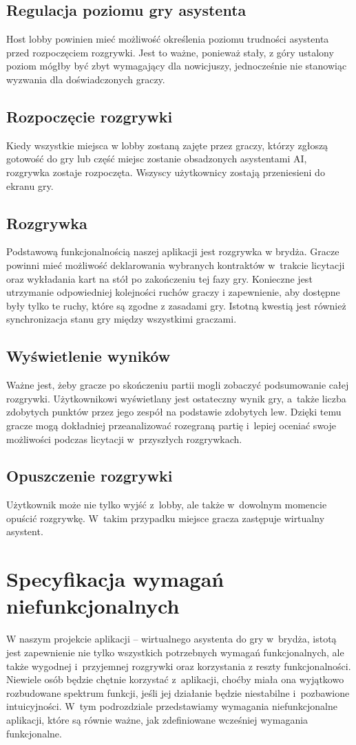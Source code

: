 \subsection{Regulacja poziomu gry asystenta}
Host lobby powinien mieć możliwość określenia poziomu trudności asystenta przed rozpoczęciem
rozgrywki. Jest to ważne, ponieważ stały, z góry ustalony poziom mógłby być zbyt wymagający
dla nowicjuszy, jednocześnie nie stanowiąc wyzwania dla doświadczonych graczy.

\subsection{Rozpoczęcie rozgrywki}
Kiedy wszystkie miejsca w lobby zostaną zajęte przez graczy, którzy zgłoszą gotowość do gry
lub część miejsc zostanie obsadzonych asystentami AI, rozgrywka zostaje rozpoczęta.
Wszyscy użytkownicy zostają przeniesieni do ekranu gry.
\subsection{Rozgrywka}
Podstawową funkcjonalnością naszej aplikacji jest rozgrywka w brydża.
Gracze powinni mieć możliwość deklarowania wybranych kontraktów
w~trakcie licytacji oraz wykładania kart na stół po zakończeniu tej fazy gry.
Konieczne jest utrzymanie odpowiedniej kolejności ruchów graczy i zapewnienie, aby
dostępne były tylko te ruchy, które są zgodne z zasadami gry. Istotną kwestią jest
również synchronizacja stanu gry między wszystkimi graczami.
\subsection{Wyświetlenie wyników}
Ważne jest, żeby gracze po skończeniu partii mogli zobaczyć
podsumowanie całej rozgrywki. Użytkownikowi wyświetlany jest ostateczny
wynik gry, a~także liczba zdobytych punktów przez jego zespół na
podstawie zdobytych lew. Dzięki temu gracze mogą dokładniej
przeanalizować rozegraną partię i~lepiej oceniać swoje możliwości
podczas licytacji w~przyszłych rozgrywkach.
\subsection{Opuszczenie rozgrywki}
Użytkownik może nie tylko wyjść z~lobby, ale także w~dowolnym momencie
opuścić rozgrywkę. W~takim przypadku miejsce gracza zastępuje
wirtualny asystent.




\section{Specyfikacja wymagań niefunkcjonalnych}
W naszym projekcie aplikacji -- wirtualnego asystenta do gry w~brydża,
istotą jest zapewnienie nie tylko wszystkich potrzebnych wymagań
funkcjonalnych, ale także wygodnej i~przyjemnej rozgrywki oraz
korzystania z reszty funkcjonalności. Niewiele osób będzie chętnie
korzystać z~aplikacji, choćby miała ona wyjątkowo rozbudowane spektrum
funkcji, jeśli jej działanie będzie niestabilne i~pozbawione
intuicyjności. W~tym podrozdziale przedstawiamy wymagania
niefunkcjonalne aplikacji, które są równie ważne, jak zdefiniowane
wcześniej wymagania funkcjonalne.
